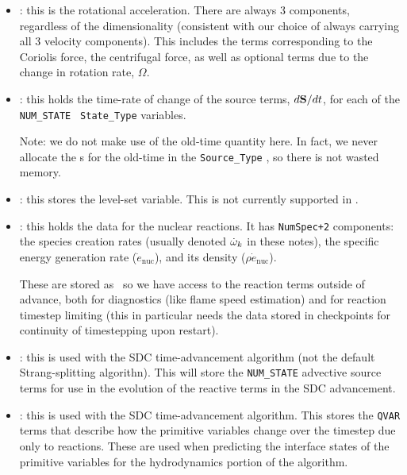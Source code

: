 \begin{itemize}
\item {} : this is the rotational acceleration.
  There are always 3 components, regardless of the dimensionality
  (consistent with our choice of always carrying all 3 velocity
  components).  This includes the terms corresponding to the Coriolis
  force, the centrifugal force, as well as optional terms due to the
  change in rotation rate, $\Omega$.

\item {} : this holds the time-rate of change of
  the source terms, $d{\bf S}/dt$, for each of the {\tt NUM\_STATE} {\tt
    State\_Type} variables.

  Note: we do not make use of the old-time quantity here. In fact, we
  never allocate the \farraybox s for the old-time in the {\tt Source\_Type}
  \statedata, so there is not wasted memory.

\item {} : this stores the level-set variable.
  This is not currently supported in \castro.

\item {} : this holds the data for the nuclear
  reactions.  It has {\tt NumSpec+2} components: the species
  creation rates (usually denoted $\dot\omega_k$ in these notes),
  the specific energy generation rate ($\dot{e}_\mathrm{nuc}$),
  and its density ($\rho \dot{e}_\mathrm{nuc}$).  

  These are stored as \statedata\ so we have access to the reaction terms
  outside of advance, both for diagnostics (like flame speed estimation)
  and for reaction timestep limiting (this in particular needs the 
  data stored in checkpoints for continuity of timestepping upon restart).


\item {} : this is used with the SDC
  time-advancement algorithm (not the default Strang-splitting
  algorithn).  This will store the {\tt NUM\_STATE} advective source
  terms for use in the evolution of the reactive terms in the SDC
  advancement.

\item {} : this is used with the SDC
  time-advancement algorithm.  This stores the {\tt QVAR} terms
  that describe how the primitive variables change over the timestep
  due only to reactions.  These are used when predicting the interface
  states of the primitive variables for the hydrodynamics portion of the
  algorithm.

\end{itemize}

